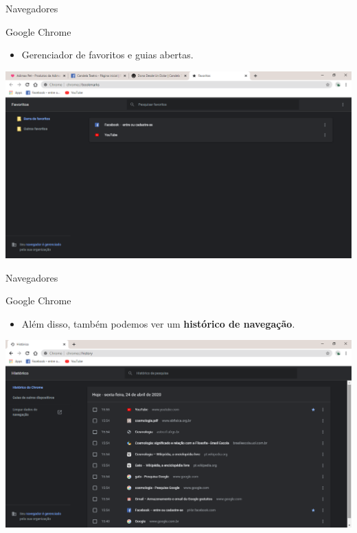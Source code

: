 \begin{frame}{Navegadores}
	\begin{block}{Google Chrome}
		\begin{itemize}
			\item Gerenciador de favoritos e guias abertas.
		\end{itemize}
	\end{block}
	
	\centering
	\includegraphics[width=0.9\linewidth]{Figuras/Ch03/fig8.12}
\end{frame}


\begin{frame}{Navegadores}
	\begin{block}{Google Chrome}
		\begin{itemize}
			\item Além disso, também podemos ver um \textbf{histórico de navegação}.
		\end{itemize}
	\end{block}
	
	\centering
	\includegraphics[width=0.9\linewidth]{Figuras/Ch03/fig8.8}
\end{frame}


